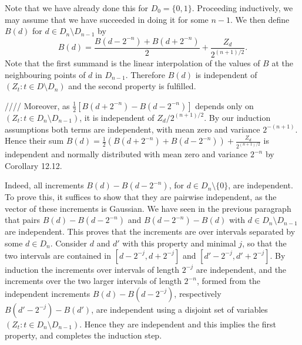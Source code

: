 \documentclass{article}
\begin{document}
Note that we have already done this for $D_0 = \{0, 1\}$. Proceeding inductively, we may assume that we have succeeded in doing it for some $n - 1$. We then define $B(d)$ for $d \in D_n \setminus D_{n-1}$ by
\[
    B(d) = \frac{B(d - 2^{-n}) + B(d + 2^{-n})}{2} + \frac{Z_d}{2^{(n+1)/2}}.
\]
Note that the first summand is the linear interpolation of the values of $B$ at the neighbouring points of $d$ in $D_{n-1}$. Therefore $B(d)$ is independent of $\left( Z_t : t \in D \setminus D_n \right)$ and the second property is fulfilled.


////
Moreover, as $\frac{1}{2}\left[ B(d + 2^{-n}) - B(d - 2^{-n}) \right]$ depends only on $(Z_t : t \in D_n \setminus D_{n-1})$, it is independent of $Z_d / 2^{(n+1)/2}$. By our induction assumptions both terms are independent, with mean zero and variance $2^{-(n+1)}$. Hence their sum $B(d) = \frac{1}{2} \left( B(d + 2^{-n}) + B(d - 2^{-n}) \right) + \frac{Z_d}{2^{(n+1)/2}}$ is independent and normally distributed with mean zero and variance $2^{-n}$ by Corollary 12.12.

Indeed, all increments $B(d) - B(d - 2^{-n})$, for $d \in D_n \setminus \{ 0 \}$, are independent. To prove this, it suffices to show that they are pairwise independent, as the vector of these increments is Gaussian. We have seen in the previous paragraph that pairs $B(d) - B(d - 2^{-n})$ and $B(d - 2^{-n}) - B(d)$ with $d \in D_n \setminus D_{n-1}$ are independent. This proves that the increments are over intervals separated by some $d \in D_n$. Consider $d$ and $d'$ with this property and minimal $j$, so that the two intervals are contained in $[d - 2^{-j}, d + 2^{-j}]$ and $[d' - 2^{-j}, d' + 2^{-j}]$. By induction the increments over intervals of length $2^{-j}$ are independent, and the increments over the two larger intervals of length $2^{-n}$, formed from the independent increments $B(d) - B(d - 2^{-j})$, respectively $B(d' - 2^{-j}) - B(d')$, are independent using a disjoint set of variables $(Z_t : t \in D_n \setminus D_{n-1})$. Hence they are independent and this implies the first property, and completes the induction step.

\end{document}
